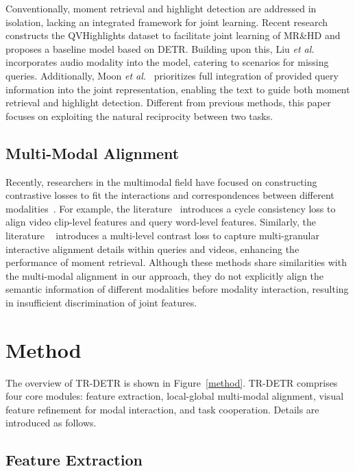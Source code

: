 Conventionally, moment retrieval and highlight detection are addressed in isolation, lacking an integrated framework for joint learning. Recent research~\cite{lei2021detecting} constructs the QVHighlights dataset to facilitate joint learning of MR\&HD and proposes a baseline model based on DETR. Building upon this, Liu \emph{et al.}~\cite{liu2022umt} incorporates audio modality into the model, catering to scenarios for missing queries. Additionally, Moon \emph{et al.}~\cite{moon2023query} prioritizes full integration of provided query information into the joint representation, enabling the text to guide both moment retrieval and highlight detection. Different from previous methods, this paper focuses on exploiting the natural reciprocity between two tasks.

\subsection{Multi-Modal Alignment}
Recently, researchers in the multimodal field have focused on constructing contrastive losses to fit the interactions and correspondences between different modalities~\cite{luo2020univl,sun2019learning,miech2020end, yan2023CAAI}. For example, the literature~\cite{ging2020coot} introduces a cycle consistency loss to align video clip-level features and query word-level features. Similarly, the literature ~\cite{zhang2022video} introduces a multi-level contrast loss to capture multi-granular interactive alignment details within queries and videos, enhancing the performance of moment retrieval.
Although these methods share similarities with the multi-modal alignment in our approach, they do not explicitly align the semantic information of different modalities before modality interaction, resulting in insufficient discrimination of joint features.

\section{Method}
The overview of TR-DETR is shown in  Figure~\ref{method}.
TR-DETR comprises four core modules: feature extraction, local-global multi-modal alignment, visual feature refinement for modal interaction, and task cooperation.
Details are introduced as follows.

\subsection{Feature Extraction}
